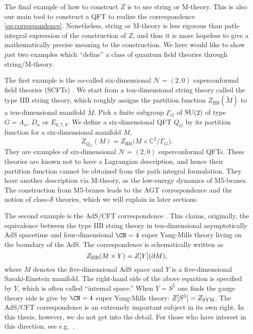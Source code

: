 The final example of how to construct $Z$ is to use string or M-theory. This
is also our main tool to construct a QFT to realize the correspondence
\eqref{eq:correspondence}. Nonetheless, string or M-theory
is less rigorous than path-integral expression of the construction
of $Z$, and thus it is more hopeless to give a mathematically precise
meaning to the construction. We here would like to show just two examples
which ``define'' a class of quantum field theories through string/M-theory.


The first example is the so-called six-dimensional $\mathcal{N}=(2,0)$
superconformal field theories (SCFTs) \cite{Witten:1995zh}.
We start from a ten-dimensional string theory called the
type IIB string theory, which roughly assigns the partition
function $Z_{\mathrm{IIB}}(\tilde{M})$ to a ten-dimensional
manifold $\tilde{M}$. Pick a finite subgroup $\Gamma_{G}$ of $\mathrm{SU}(2)$
of type $G=A_{n},\,D_{n}$ or $E_{6,7,8}$. We define a six-dimensional
QFT $Q_{G}$ by its partition function for a six-dimensional manifold
$M$,
\begin{equation}
Z_{Q_{G}}(M)  =  Z_{\mathrm{IIB}}\big(M\times\mathbb{C}^{2}/\Gamma_{G}\big).
\end{equation}
 They are examples of six-dimensional $\mathcal{N}=(2,0)$
superconformal QFTs. These theories are known not to have a Lagrangian
description, and hence their partition function cannot be obtained from
the path integral formulation. They have another description via M-theory,
as the low-energy dynamics of M5-branes. The construction from M5-branes
leads to the AGT correspondence and the notion of class-$\mathcal{S}$
theories, which we will explain in later sections.


The second example is the AdS/CFT correspondence \cite{Maldacena:1997re,Gubser:1998bc,Witten:1998qj}.
This claims, originally, the equivalence between the type IIB string theory in ten-dimensional asymptotically
AdS spacetime and four-dimensional $\CN=4$ super Yang-Mills theory living on the boundary of the AdS.
The correspondence is schematically written as
\begin{equation}
  Z_{{\rm IIB}}(M\times Y) = Z[Y](\partial M),
\end{equation}
where $M$ denotes the five-dimensional AdS space and $Y$ is a five-dimensional Sasaki-Einstein manifold.
The right-hand side of the above equation is specified by $Y$, which is often called ``internal space.''
When $Y=S^5$ one finds the gauge theory side is give by $\CN=4$ super Yang-Mills theory:
$Z[S^5]=Z_{\rm SYM}$.
The AdS/CFT correspondence is an extremely important subject in its own right.
In this thesis, however, we do not get into the detail. For those who have interest in this direction,
see e.g.~\cite{Aharony:1999ti}.








